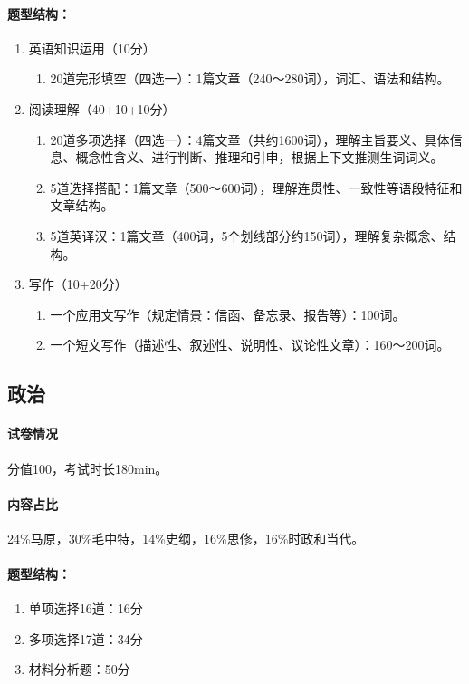 \paragraph{题型结构：}
\begin{enumerate}
    \item 英语知识运用（10分）
    \begin{enumerate}
        \item 20道完形填空（四选一）：1篇文章（240～280词），词汇、语法和结构。
    \end{enumerate}
    \item 阅读理解（40+10+10分）
    \begin{enumerate}
        \item 20道多项选择（四选一）：4篇文章（共约1600词），理解主旨要义、具体信息、概念性含义、进行判断、推理和引申，根据上下文推测生词词义。
        \item 5道选择搭配：1篇文章（500～600词），理解连贯性、一致性等语段特征和文章结构。
        \item 5道英译汉：1篇文章（400词，5个划线部分约150词），理解复杂概念、结构。
    \end{enumerate}
    \item 写作（10+20分）
    \begin{enumerate}
        \item 一个应用文写作（规定情景：信函、备忘录、报告等）：100词。
        \item 一个短文写作（描述性、叙述性、说明性、议论性文章）：160～200词。
    \end{enumerate}
\end{enumerate}

\subsection{政治}
\paragraph{试卷情况} 分值100，考试时长180min。
\paragraph{内容占比} 24\%马原，30\%毛中特，14\%史纲，16\%思修，16\%时政和当代。
\paragraph{题型结构：}
\begin{enumerate}
    \item 单项选择16道：16分
    \item 多项选择17道：34分
    \item 材料分析题：50分
\end{enumerate}

